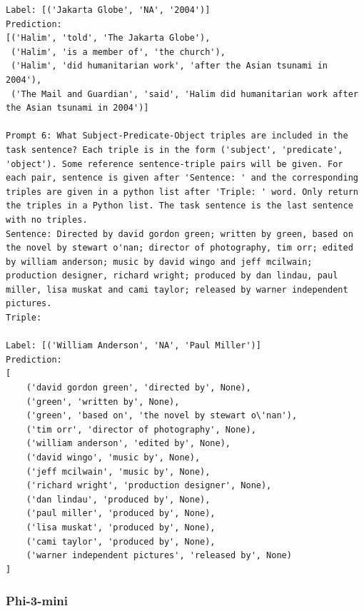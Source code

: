 \documentclass{article}
\begin{document}
\begin{lstlisting}
Label: [('Jakarta Globe', 'NA', '2004')]
Prediction: 
[('Halim', 'told', 'The Jakarta Globe'),
 ('Halim', 'is a member of', 'the church'),
 ('Halim', 'did humanitarian work', 'after the Asian tsunami in 2004'),
 ('The Mail and Guardian', 'said', 'Halim did humanitarian work after the Asian tsunami in 2004')]

Prompt 6: What Subject-Predicate-Object triples are included in the task sentence? Each triple is in the form ('subject', 'predicate', 'object'). Some reference sentence-triple pairs will be given. For each pair, sentence is given after 'Sentence: ' and the corresponding triples are given in a python list after 'Triple: ' word. Only return the triples in a Python list. The task sentence is the last sentence with no triples.
Sentence: Directed by david gordon green; written by green, based on the novel by stewart o'nan; director of photography, tim orr; edited by william anderson; music by david wingo and jeff mcilwain; production designer, richard wright; produced by dan lindau, paul miller, lisa muskat and cami taylor; released by warner independent pictures. 
Triple:

Label: [('William Anderson', 'NA', 'Paul Miller')]
Prediction: 
[
    ('david gordon green', 'directed by', None),
    ('green', 'written by', None),
    ('green', 'based on', 'the novel by stewart o\'nan'),
    ('tim orr', 'director of photography', None),
    ('william anderson', 'edited by', None),
    ('david wingo', 'music by', None),
    ('jeff mcilwain', 'music by', None),
    ('richard wright', 'production designer', None),
    ('dan lindau', 'produced by', None),
    ('paul miller', 'produced by', None),
    ('lisa muskat', 'produced by', None),
    ('cami taylor', 'produced by', None),
    ('warner independent pictures', 'released by', None)
]
\end{lstlisting}
\subsubsection{Phi-3-mini}
\end{document}

